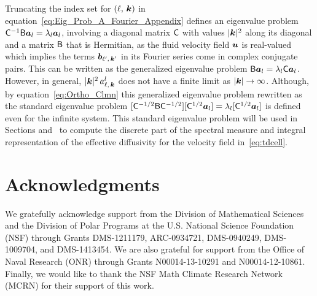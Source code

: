 \documentclass[amsa]{ipart}
\begin{document}
Truncating the index set for $(\ell,\,\boldsymbol{k})$
in equation~\eqref{eq:Eig_Prob_A_Fourier_Appendix} defines an
eigenvalue problem 
$\mathsf{C}^{-1}\mathsf{B}\boldsymbol{a}_l=\lambda_l\boldsymbol{a}_l$, involving a diagonal matrix $\mathsf{C}$
with values $|\boldsymbol{k}|^2$ along its diagonal and a matrix $\mathsf{B}$ that is
Hermitian, as the fluid velocity field $\boldsymbol{u}$ is real-valued which 
implies the terms $\boldsymbol{b}_{\ell^\prime,\,\boldsymbol{k}^\prime}$ in its Fourier series
come in complex conjugate pairs. This can be written as the generalized
eigenvalue problem $\mathsf{B}\boldsymbol{a}_l=\lambda_l\mathsf{C}\boldsymbol{a}_l$. However, in general,
$|\boldsymbol{k}|^2\,a^l_{\ell,\,\boldsymbol{k}}$ does not have a finite 
limit as $|\boldsymbol{k}|\to\infty$. Although, by equation~\eqref{eq:Ortho_Clmn}
this generalized eigenvalue problem rewritten as the standard
eigenvalue problem
$[\mathsf{C}^{-1/2}\mathsf{B}\mathsf{C}^{-1/2}][\mathsf{C}^{1/2}\boldsymbol{a}_l]=\lambda_l[\mathsf{C}^{1/2}\boldsymbol{a}_l]$ is 
defined even for the infinite system. This standard eigenvalue problem
will be     
used in Sections 
and~ to compute the discrete part of the  
spectral measure and integral representation of the effective
diffusivity for the velocity field in~\eqref{eq:tdcell}. 












\medskip

\section*{Acknowledgments}
We gratefully acknowledge support from the Division of Mathematical
  Sciences and the Division of Polar Programs at the U.S. National
  Science Foundation (NSF) through Grants DMS-1211179, 
  ARC-0934721, DMS-0940249, DMS-1009704, and DMS-1413454. 
  We are also grateful for support from
  the Office of Naval Research (ONR) through Grants N00014-13-10291 and
  N00014-12-10861. Finally, we would like to thank the NSF Math Climate
  Research Network (MCRN) for their support of this work. 

\medskip




%


\end{document}
